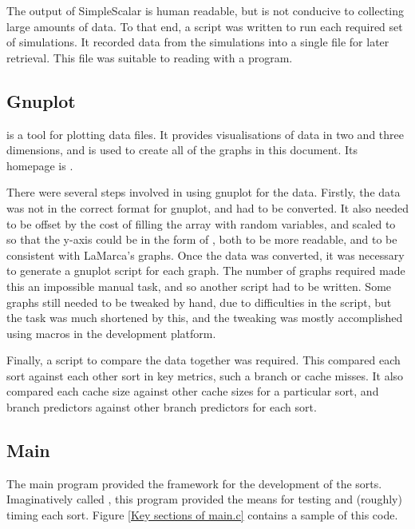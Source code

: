 The output of SimpleScalar is human readable, but is not conducive to collecting
large amounts of data. To that end, a script was written to run each required
set of simulations. It recorded data from the simulations into a single file for
later retrieval. This file was suitable to reading with a  program.

\subsection{Gnuplot}
\label{Gnuplot}
 is a tool for plotting data files. It provides visualisations of
data in two and three dimensions, and is used to create all of the graphs in
this document. Its homepage is .

There were several steps involved in using gnuplot for the data. Firstly, the
data was not in the correct format for gnuplot, and had to be converted. It also
needed to be offset by the cost of filling the array with random variables, and
scaled to so that the y-axis could be in the form of ,
both to be more readable, and to be consistent with LaMarca's graphs. Once the
data was converted, it was necessary to generate a gnuplot script for each
graph. The number of graphs required made this an impossible manual task, and
so another script had to be written. Some graphs still needed to be tweaked by
hand, due to difficulties in the script, but the task was much shortened by
this, and the tweaking was mostly accomplished using macros in the development
platform.

Finally, a script to compare the data together was required. This compared each
sort against each other sort in key metrics, such a branch or cache misses. It
also compared each cache size against other cache sizes for a particular sort,
and branch predictors against other branch predictors for each sort. 

\subsection{Main}
\label{Main}

The main program provided the framework for the development of the sorts.
Imaginatively called , this program provided the means for testing
and (roughly) timing each sort. Figure \vref{Key sections of main.c} contains a
sample of this code.


